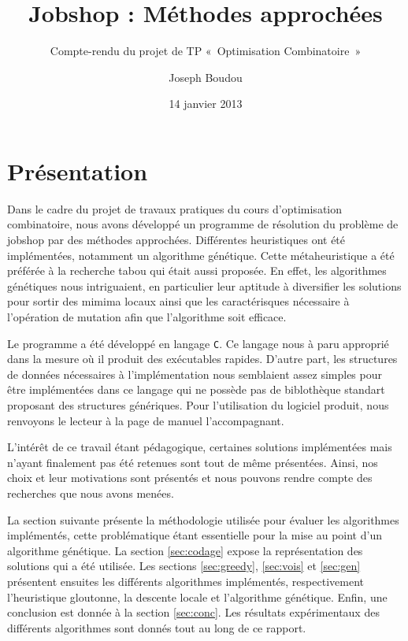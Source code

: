 \documentclass[french]{rapport}
\begin{document}
\title{Jobshop : Méthodes approchées}
\subtitle{Compte-rendu du projet de TP «~Optimisation Combinatoire~»}
\author{Joseph Boudou}
\date{14 janvier 2013}
\maketitle

\section{Présentation}

Dans le cadre du projet de travaux pratiques du cours d'optimisation combinatoire, nous avons
développé un programme de résolution du problème de jobshop par des méthodes approchées. Différentes
heuristiques ont été implémentées, notamment un algorithme génétique. Cette métaheuristique a été
préférée à la recherche tabou qui était aussi proposée. En effet, les algorithmes génétiques nous
intriguaient, en particulier leur aptitude à diversifier les solutions pour sortir des mimima locaux
ainsi que les caractérisques nécessaire à l'opération de mutation afin que l'algorithme soit
efficace.

Le programme a été développé en langage \texttt{C}. Ce langage nous à paru approprié dans la mesure
où il produit des exécutables rapides. D'autre part, les structures de données nécessaires à
l'implémentation nous semblaient assez simples pour être implémentées dans ce langage qui ne possède
pas de biblothèque standart proposant des structures génériques. Pour l'utilisation du logiciel
produit, nous renvoyons le lecteur à la page de manuel l'accompagnant.

L'intérêt de ce travail étant pédagogique, certaines solutions implémentées mais n'ayant finalement
pas été retenues sont tout de même présentées. Ainsi, nos choix et leur motivations sont présentés
et nous pouvons rendre compte des recherches que nous avons menées.

La section suivante présente la méthodologie utilisée pour évaluer les algorithmes implémentés,
cette problématique étant essentielle pour la mise au point d'un algorithme génétique. La section
\ref{sec:codage} expose la représentation des solutions qui a été utilisée. Les sections
\ref{sec:greedy}, \ref{sec:vois} et \ref{sec:gen} présentent ensuites les différents algorithmes
implémentés, respectivement l'heuristique gloutonne, la descente locale et l'algorithme génétique.
Enfin, une conclusion est donnée à la section \ref{sec:conc}. Les résultats expérimentaux des
différents algorithmes sont donnés tout au long de ce rapport.
\end{document}
